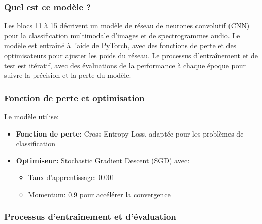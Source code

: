 \documentclass{article}
\begin{document}
\subsubsection{Quel est ce modèle ?}
\label{subsubsec:quel_modele}

Les blocs 11 à 15 décrivent un modèle de réseau de neurones convolutif (CNN) pour la classification multimodale d'images et de spectrogrammes audio. Le modèle est entraîné à l'aide de PyTorch, avec des fonctions de perte et des optimisateurs pour ajuster les poids du réseau. Le processus d'entraînement et de test est itératif, avec des évaluations de la performance à chaque époque pour suivre la précision et la perte du modèle.

\subsubsection{Fonction de perte et optimisation}
\label{subsubsec:loss_optim}

Le modèle utilise:
\begin{itemize}
    \item \textbf{Fonction de perte:} Cross-Entropy Loss, adaptée pour les problèmes de classification
    \item \textbf{Optimiseur:} Stochastic Gradient Descent (SGD) avec:
    \begin{itemize}
        \item Taux d'apprentissage: 0.001
        \item Momentum: 0.9 pour accélérer la convergence
    \end{itemize}
\end{itemize}

\subsubsection{Processus d'entraînement et d'évaluation}
\label{subsec:training}
\end{document}
